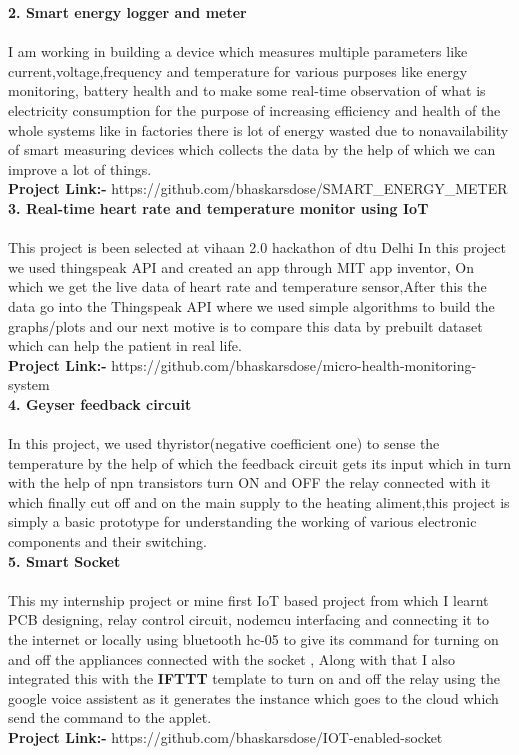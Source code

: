 \documentclass[10pt]{report}
\begin{document}
\noindent\textbf{\large 2. Smart energy logger and meter\\[1pt]}
\\I am working in building a device which measures multiple parameters like current,voltage,frequency and temperature for various purposes like energy monitoring, battery health and to make some real-time observation of what is electricity consumption for the purpose of increasing efficiency and health of the whole systems like in factories there is lot of energy wasted due to nonavailability of smart measuring devices which collects the data by the help of which we can improve a lot of things.
\\\textbf{Project Link:-} https://github.com/bhaskarsdose/SMART\_ENERGY\_METER\\[2pt]

\noindent\textbf{\large 3. Real-time heart rate and temperature monitor using IoT\\[1pt]}
\\This project is been selected at vihaan 2.0 hackathon of dtu Delhi In this project we used thingspeak API and created an app through MIT app inventor, On which we get the live data of heart rate and temperature sensor,After this the data go into the Thingspeak API where we used simple algorithms to build the graphs/plots and our next motive is to compare this data by prebuilt dataset which can help the patient in real life.
\\\textbf{Project Link:-} https://github.com/bhaskarsdose/micro-health-monitoring-system\\[2pt]

\noindent\textbf{\large 4. Geyser feedback circuit\\[1pt]}
\\In this project, we used thyristor(negative coefficient one) to sense the temperature by the help of which the feedback circuit gets its input which in turn with the help of npn transistors turn ON and OFF the relay connected with it which finally cut off and on the main supply to the heating aliment,this project is simply a basic prototype for understanding the working of various electronic components and their switching.\\[2pt]

\noindent\textbf{\large 5. Smart Socket\\[1pt]}
\\This my internship project or mine first IoT based project from which I learnt PCB designing, relay control circuit, nodemcu interfacing and connecting it to the internet or locally using bluetooth hc-05 to give its command for turning on and off the appliances connected with the socket , Along with that I also integrated this with the \textbf{IFTTT} template to turn on and off the relay using the google voice assistent as it generates the instance which goes to the cloud which send the command to the applet.
\\\textbf{Project Link:-} https://github.com/bhaskarsdose/IOT-enabled-socket\\[2pt]
\end{document}
